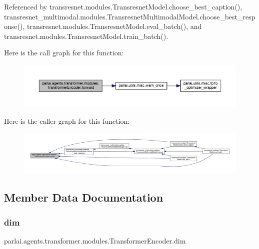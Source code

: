 Referenced by transresnet.\+modules.\+Transresnet\+Model.\+choose\+\_\+best\+\_\+caption(), transresnet\+\_\+multimodal.\+modules.\+Transresnet\+Multimodal\+Model.\+choose\+\_\+best\+\_\+response(), transresnet.\+modules.\+Transresnet\+Model.\+eval\+\_\+batch(), and transresnet.\+modules.\+Transresnet\+Model.\+train\+\_\+batch().

Here is the call graph for this function\+:
\nopagebreak
\begin{figure}[H]
\begin{center}
\leavevmode
\includegraphics[width=350pt]{classparlai_1_1agents_1_1transformer_1_1modules_1_1TransformerEncoder_a23005871ba6683940f63511ed463266f_cgraph}
\end{center}
\end{figure}
Here is the caller graph for this function\+:
\nopagebreak
\begin{figure}[H]
\begin{center}
\leavevmode
\includegraphics[width=350pt]{classparlai_1_1agents_1_1transformer_1_1modules_1_1TransformerEncoder_a23005871ba6683940f63511ed463266f_icgraph}
\end{center}
\end{figure}


\subsection{Member Data Documentation}
\mbox{\label{classparlai_1_1agents_1_1transformer_1_1modules_1_1TransformerEncoder_ab56fa99f887753677dc7f4d435595114}} 
\subsubsection{\texorpdfstring{dim}{dim}}
{\footnotesize\ttfamily parlai.\+agents.\+transformer.\+modules.\+Transformer\+Encoder.\+dim}



